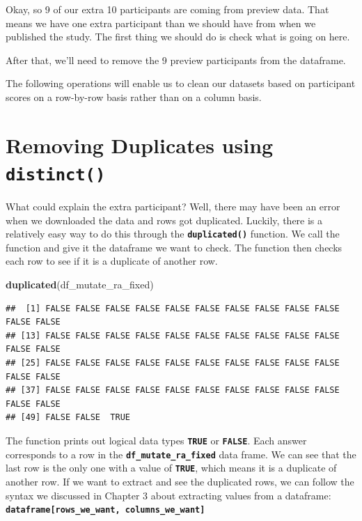 \documentclass[
]{book}
\newenvironment{Shaded}{\begin{snugshade}}{\end{snugshade}}
\newcommand{\FunctionTok}[1]{\textcolor[rgb]{0.13,0.29,0.53}{\textbf{#1}}}
\newcommand{\NormalTok}[1]{#1}
\begin{document}
Okay, so 9 of our extra 10 participants are coming from preview data. That means we have one extra participant than we should have from when we published the study. The first thing we should do is check what is going on here.

After that, we'll need to remove the 9 preview participants from the dataframe.

The following operations will enable us to clean our datasets based on participant scores on a row-by-row basis rather than on a column basis.

\hypertarget{removing-duplicates-using-distinct}{%
\section{\texorpdfstring{Removing Duplicates using \texttt{distinct()}}{Removing Duplicates using distinct()}}\label{removing-duplicates-using-distinct}}

What could explain the extra participant? Well, there may have been an error when we downloaded the data and rows got duplicated. Luckily, there is a relatively easy way to do this through the \textbf{\texttt{duplicated()}} function. We call the function and give it the dataframe we want to check. The function then checks each row to see if it is a duplicate of another row.

\begin{Shaded}
\begin{Highlighting}[]
\FunctionTok{duplicated}\NormalTok{(df\_mutate\_ra\_fixed)}
\end{Highlighting}
\end{Shaded}

\begin{verbatim}
##  [1] FALSE FALSE FALSE FALSE FALSE FALSE FALSE FALSE FALSE FALSE FALSE FALSE
## [13] FALSE FALSE FALSE FALSE FALSE FALSE FALSE FALSE FALSE FALSE FALSE FALSE
## [25] FALSE FALSE FALSE FALSE FALSE FALSE FALSE FALSE FALSE FALSE FALSE FALSE
## [37] FALSE FALSE FALSE FALSE FALSE FALSE FALSE FALSE FALSE FALSE FALSE FALSE
## [49] FALSE FALSE  TRUE
\end{verbatim}

The function prints out logical data types \textbf{\texttt{TRUE}} or \textbf{\texttt{FALSE}}. Each answer corresponds to a row in the \textbf{\texttt{df\_mutate\_ra\_fixed}} data frame. We can see that the last row is the only one with a value of \textbf{\texttt{TRUE}}, which means it is a duplicate of another row. If we want to extract and see the duplicated rows, we can follow the syntax we discussed in Chapter 3 about extracting values from a dataframe: \textbf{\texttt{dataframe{[}rows\_we\_want,\ columns\_we\_want{]}}}
\end{document}
